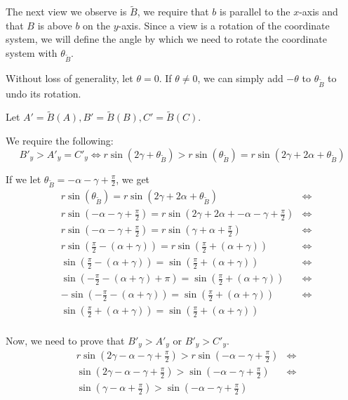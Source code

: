 \documentclass[a4paper,12pt]{article}
\newcommand{\HSview}[1][V]{\widetilde{#1}}
\theoremstyle{definition}
\theoremstyle{plain}
\begin{document}
	The next view we observe is $\HSview[B]$, we require that $b$ is parallel to the $x$-axis and that $B$ is above $b$ on the
	$y$-axis. Since a view is a rotation of the coordinate system, we will define the angle by which we need to rotate
	the coordinate system with $\theta_{\HSview[B]}$.
	
	Without loss of generality, let $\theta = 0$. If $\theta \neq 0$, we can
	simply add $-\theta$ to $\theta_{\HSview[B]}$ to undo its rotation.

	Let $A' = \HSview[B]\left(A\right), B' = \HSview[B]\left(B\right), C' = \HSview[B]\left(C\right)$.

	We require the following:
	$$
		B'_y > A'_y = C'_y \iff
		r\sin\left(2\gamma + \theta_{\HSview[B]}\right) >
		r\sin\left(\theta_{\HSview[B]}\right) =
		r\sin\left(2\gamma + 2\alpha + \theta_{\HSview[B]}\right)
	$$
	
	If we let $\theta_{\HSview[B]} = -\alpha - \gamma + \frac{\pi}{2}$, we get
	\begin{align*}
		& r\sin\left(\theta_{\HSview[B]}\right) =
		  r\sin\left(2\gamma + 2\alpha + \theta_{\HSview[B]}\right) & \iff \\
		& r\sin\left(-\alpha - \gamma + \frac{\pi}{2}\right) =
		  r\sin\left(2\gamma + 2\alpha + -\alpha - \gamma + \frac{\pi}{2}\right) & \iff \\
		& r\sin\left(-\alpha - \gamma + \frac{\pi}{2}\right) =
		  r\sin\left(\gamma + \alpha + \frac{\pi}{2}\right) & \iff \\
		& r\sin\left(\frac{\pi}{2} -\left(\alpha + \gamma\right) \right) =
		  r\sin\left(\frac{\pi}{2} + \left(\alpha + \gamma\right)\right) & \iff \\
		& \sin\left(\frac{\pi}{2} -\left(\alpha + \gamma\right) \right) =
		  \sin\left(\frac{\pi}{2} + \left(\alpha + \gamma\right)\right) & \iff \\
		& \sin\left(-\frac{\pi}{2} -\left(\alpha + \gamma\right) + \pi \right) =
		  \sin\left(\frac{\pi}{2} + \left(\alpha + \gamma\right)\right) & \iff \\
		& -\sin\left(-\frac{\pi}{2} -\left(\alpha + \gamma\right)\right) =
		  \sin\left(\frac{\pi}{2} + \left(\alpha + \gamma\right)\right) & \iff \\
		& \sin\left(\frac{\pi}{2} +\left(\alpha + \gamma\right)\right) =
		  \sin\left(\frac{\pi}{2} + \left(\alpha + \gamma\right)\right) \\
	\end{align*}

	Now, we need to prove that $B'_y > A'_y$ or $B'_y > C'_y$.
	\begin{align*}
		& r\sin\left(2\gamma - \alpha - \gamma + \frac{\pi}{2}\right) >
		  r\sin\left(-\alpha - \gamma + \frac{\pi}{2}\right) & \iff \\
		& \sin\left(2\gamma - \alpha - \gamma + \frac{\pi}{2}\right) >
		  \sin\left(-\alpha - \gamma + \frac{\pi}{2}\right) & \iff \\
		& \sin\left(\gamma - \alpha + \frac{\pi}{2}\right) >
		  \sin\left(-\alpha - \gamma + \frac{\pi}{2}\right)
	\end{align*}
\end{document}

